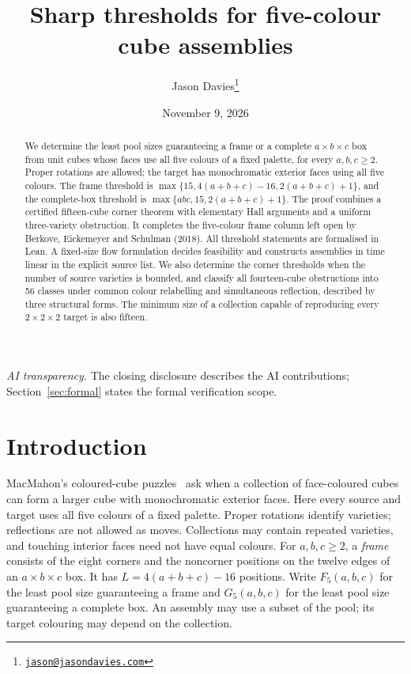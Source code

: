 \documentclass[11pt]{article}
\title{Sharp thresholds for five-colour cube assemblies}
\author{Jason Davies\thanks{\href{mailto:jason@jasondavies.com}{\nolinkurl{jason@jasondavies.com}}}}
\date{November 9, 2026}
\theoremstyle{remark}
\begin{document}
\maketitle
\begin{abstract}
We determine the least pool sizes guaranteeing a frame or a complete
$a\times b\times c$ box from unit cubes whose faces use all five colours
of a fixed palette, for every $a,b,c\ge2$. Proper rotations are allowed;
the target has monochromatic exterior faces using all five colours.
The frame threshold is $\max\{15,4(a+b+c)-16,2(a+b+c)+1\}$, and the
complete-box threshold is $\max\{abc,15,2(a+b+c)+1\}$.
The proof combines a certified fifteen-cube corner theorem with elementary
Hall arguments and a uniform three-variety obstruction. It completes the
five-colour frame column left open by Berkove, Eickemeyer and Schulman
(2018). All threshold statements are formalised in Lean. A fixed-size flow
formulation decides feasibility and constructs assemblies in time linear
in the explicit source list. We also determine the corner thresholds when the
number of source varieties is bounded, and classify all fourteen-cube
obstructions into 56 classes under common colour relabelling and simultaneous
reflection, described by three structural forms. The minimum size of a
collection capable of reproducing every $2\times2\times2$ target is also fifteen.
\end{abstract}
\noindent\small\textit{AI transparency.} The closing disclosure describes the AI
contributions; Section~\ref{sec:formal} states the formal verification scope.
\normalsize

\section{Introduction}
MacMahon's coloured-cube puzzles~\cite{MacMahon} ask when a collection of
face-coloured cubes can form a larger cube with monochromatic exterior
faces. Here every source and target uses all five colours of a fixed
palette. Proper rotations identify varieties; reflections are not allowed
as moves. Collections may contain repeated varieties, and touching interior
faces need not have equal colours.
For $a,b,c\ge2$, a \emph{frame} consists of the eight corners and the
noncorner positions on the twelve edges of an $a\times b\times c$ box.
It has $L=4(a+b+c)-16$ positions. Write $F_5(a,b,c)$ for the least pool
size guaranteeing a frame and $G_5(a,b,c)$ for the least pool size
guaranteeing a complete box. An assembly may use a subset of the pool;
its target colouring may depend on the collection.
\end{document}
